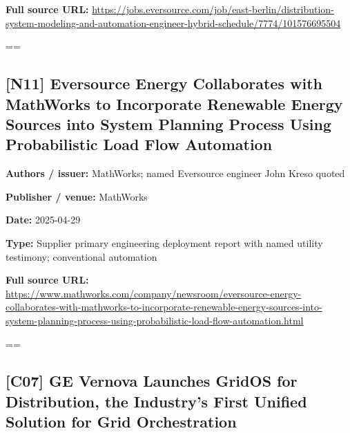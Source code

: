 \documentclass[10pt,letterpaper]{article}
\begin{document}
\textbf{Full source URL:} \href{https://jobs.eversource.com/job/east-berlin/distribution-system-modeling-and-automation-engineer-hybrid-schedule/7774/101576695504}{\small\ttfamily https:/\allowbreak{}/\allowbreak{}jobs.\allowbreak{}eversource.\allowbreak{}com/\allowbreak{}job/\allowbreak{}east-\allowbreak{}berlin/\allowbreak{}distribution-\allowbreak{}system-\allowbreak{}modeling-\allowbreak{}and-\allowbreak{}automation-\allowbreak{}engineer-\allowbreak{}hybrid-\allowbreak{}schedule/\allowbreak{}7774/\allowbreak{}101576695504}\par
\egroup\par\noindent\box\readingEntry\par\medskip
\setbox\readingEntry=\vbox\bgroup\hsize=\linewidth\subsection*{[N11] Eversource Energy Collaborates with MathWorks to Incorporate Renewable Energy Sources into System Planning Process Using Probabilistic Load Flow Automation}
\textbf{Authors / issuer:} MathWorks; named Eversource engineer John Kreso quoted\par
\textbf{Publisher / venue:} MathWorks\par
\textbf{Date:} 2025-04-29\par
\textbf{Type:} Supplier primary engineering deployment report with named utility testimony; conventional automation\par
\textbf{Full source URL:} \href{https://www.mathworks.com/company/newsroom/eversource-energy-collaborates-with-mathworks-to-incorporate-renewable-energy-sources-into-system-planning-process-using-probabilistic-load-flow-automation.html}{\small\ttfamily https:/\allowbreak{}/\allowbreak{}www.\allowbreak{}mathworks.\allowbreak{}com/\allowbreak{}company/\allowbreak{}newsroom/\allowbreak{}eversource-\allowbreak{}energy-\allowbreak{}collaborates-\allowbreak{}with-\allowbreak{}mathworks-\allowbreak{}to-\allowbreak{}incorporate-\allowbreak{}renewable-\allowbreak{}energy-\allowbreak{}sources-\allowbreak{}into-\allowbreak{}system-\allowbreak{}planning-\allowbreak{}process-\allowbreak{}using-\allowbreak{}probabilistic-\allowbreak{}load-\allowbreak{}flow-\allowbreak{}automation.\allowbreak{}html}\par
\egroup\par\noindent\box\readingEntry\par\medskip
\setbox\readingEntry=\vbox\bgroup\hsize=\linewidth\subsection*{[C07] GE Vernova Launches GridOS for Distribution, the Industry's First Unified Solution for Grid Orchestration}
\end{document}
